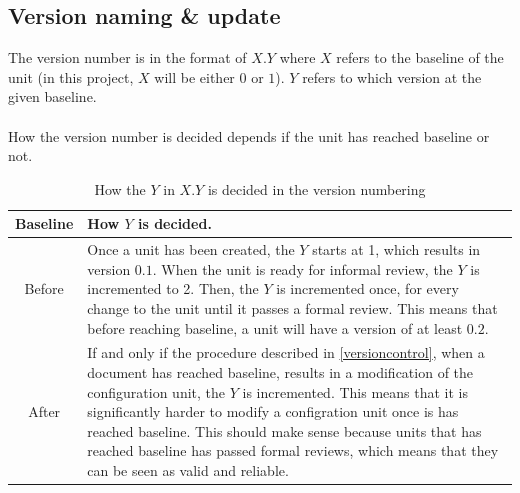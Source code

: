 \documentclass{article}
\begin{document}
    \subsection{Version naming \& update}
        The version number is in the format of $X.Y$ where $X$ refers to the baseline
        of the unit (in this project, $X$ will be either $0$ or $1$). $Y$ refers
        to which version at the given baseline.
        \\ \\
        How the version number is decided depends if the unit has reached baseline or not.
        \begin{table}[h]
            \centering
            \begin{tabular}{|c|l|}
                \hline
                    \textbf{Baseline} & \textbf{How $Y$ is decided.} \\
                \hline
                    Before & \parbox{.8\textwidth} { \vspace{.2cm}
                            Once a unit has been created, the $Y$
                            starts at 1, which results in version $0.1$. When the unit is ready for informal
                            review, the $Y$ is incremented to 2. Then, the $Y$ is incremented once, for every change to the unit until it passes a formal review. This means that before reaching baseline, a unit will have a version of at least $0.2$.
                            \vspace{.2cm} } \\
                \hline
                    After & \parbox{.8\textwidth} { \vspace{.2cm}
                        If and only if the procedure described in \ref{versioncontrol}, when a document has reached baseline, results in a modification of the
                        configuration unit, the $Y$ is incremented. This means that
                        it is significantly harder to modify a configration unit once
                        is has reached baseline. This should make sense because units
                        that has reached baseline has passed formal reviews, which means
                        that they can be seen as valid and reliable.
                        \vspace{.2cm}} \\
                \hline
            \end{tabular}
            \caption{How the $Y$ in $X.Y$ is decided in the version numbering}
            \label{versionnumber}
        \end{table}
\end{document}
